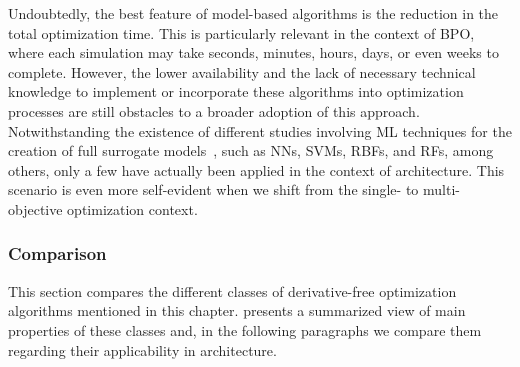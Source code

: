 	Undoubtedly, the best feature of model-based algorithms is the reduction in the total optimization time. This is particularly relevant in the context of \ac{BPO}, where each simulation may take seconds, minutes, hours, days, or even weeks to complete. However, the lower availability and the lack of necessary technical knowledge to implement or incorporate these algorithms into optimization processes are still obstacles to a broader adoption of this approach. Notwithstanding the existence of different studies involving \ac{ML} techniques for the creation of full surrogate models~\cite{Koziel2011, Forrester2009SBO}, such as \acp{NN}, \acp{SVM}, \acp{RBF}, and \acp{RF}, among others, only a few have actually been applied in the context of architecture. This scenario is even more self-evident when we shift from the single- to multi-objective optimization context.
	
	\subsubsection{Comparison}
	\label{ssec:comparisondfo}
	
	This section compares the different classes of derivative-free optimization algorithms mentioned in this chapter.  presents a summarized view of main properties of these classes and, in the following paragraphs we compare them regarding their applicability in architecture. 
	
